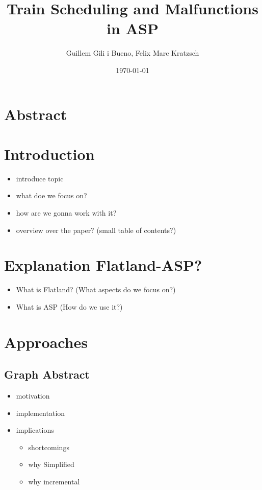 \documentclass{llncs}
\begin{document}
\title{Train Scheduling and Malfunctions in ASP}
\author{Guillem Gili i Bueno, Felix Marc Kratzsch}
\date{\today}
\maketitle
\begin{multicols*}{2}


\section{Abstract}

\section{Introduction}
\begin{itemize}
    \item introduce topic
    \item what doe we focus on?
    \item how are we gonna work with it?
    \item overview over the paper? (small table of contents?)
\end{itemize}

\section{Explanation Flatland-ASP?}
\begin{itemize}
    \item What is Flatland? (What aspects do we focus on?)
    \item What is ASP (How do we use it?)
\end{itemize}
\section{Approaches}

\color{blue}
\subsection{Graph Abstract}
\begin{itemize}
    \item motivation
    \item implementation
    \item implications
    \begin{itemize}
        \item shortcomings
        \item why Simplified
        \item why incremental
    \end{itemize}
\end{itemize}


\end{multicols*}
\end{document}
